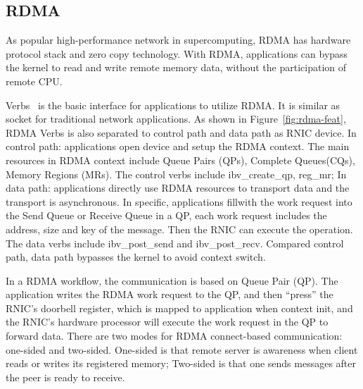\subsection{RDMA}
As popular high-performance network in supercomputing, RDMA has hardware protocol stack and zero copy technology. With RDMA, applications can bypass the kernel to read and write remote memory data, without the participation of remote CPU. 



Verbs~\cite{verbs} is the basic interface for applications to utilize RDMA. It is similar as socket for traditional network applications. As shown in Figure~\ref{fig:rdma-feat}, RDMA Verbs is also separated to control path and data path as RNIC device. In control path: applications open device and setup the RDMA context. The main resources in RDMA context include Queue Pairs (QPs), Complete Queues(CQs), Memory Regions (MRs). The control verbs include ibv\_create\_qp, reg\_mr;  In data path: applications directly use RDMA resources to transport data and the transport is asynchronous. In specific, applications fillwith the work request into the Send Queue or Receive Queue in a QP, each work request includes the address, size and key of the message. Then the RNIC can execute the operation. The data verbs include ibv\_post\_send and ibv\_post\_recv. Compared control path, data path bypasses the kernel to avoid context switch.

In a RDMA workflow, the communication is based on Queue Pair (QP). The application writes the RDMA work request to the QP, and then ``press''  the RNIC's doorbell register, which is mapped to application when context init, and the RNIC's hardware processor will execute the work request in the QP to forward data. There are two modes for RDMA connect-based communication: one-sided and two-sided. One-sided is that remote server is awareness when client reads or writes its registered memory; Two-sided is that one sends messages after the peer is ready to receive.